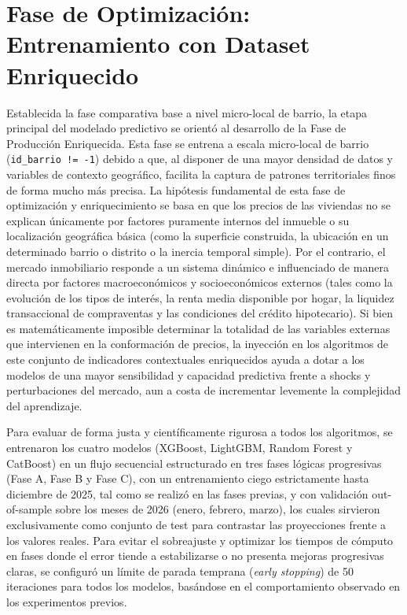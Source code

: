 \documentclass[a4paper,11pt,openany]{book}
\begin{document}
\section{Fase de Optimización: Entrenamiento con Dataset Enriquecido}
Establecida la fase comparativa base a nivel micro-local de barrio, la etapa principal del modelado predictivo se orientó al desarrollo de la Fase de Producción Enriquecida. Esta fase se entrena a escala micro-local de barrio (\texttt{id\_barrio != -1}) debido a que, al disponer de una mayor densidad de datos y variables de contexto geográfico, facilita la captura de patrones territoriales finos de forma mucho más precisa. La hipótesis fundamental de esta fase de optimización y enriquecimiento se basa en que los precios de las viviendas no se explican únicamente por factores puramente internos del inmueble o su localización geográfica básica (como la superficie construida, la ubicación en un determinado barrio o distrito o la inercia temporal simple). Por el contrario, el mercado inmobiliario responde a un sistema dinámico e influenciado de manera directa por factores macroeconómicos y socioeconómicos externos (tales como la evolución de los tipos de interés, la renta media disponible por hogar, la liquidez transaccional de compraventas y las condiciones del crédito hipotecario). Si bien es matemáticamente imposible determinar la totalidad de las variables externas que intervienen en la conformación de precios, la inyección en los algoritmos de este conjunto de indicadores contextuales enriquecidos ayuda a dotar a los modelos de una mayor sensibilidad y capacidad predictiva frente a shocks y perturbaciones del mercado, aun a costa de incrementar levemente la complejidad del aprendizaje.

Para evaluar de forma justa y científicamente rigurosa a todos los algoritmos, se entrenaron los cuatro modelos (XGBoost, LightGBM, Random Forest y CatBoost) en un flujo secuencial estructurado en tres fases lógicas progresivas (Fase A, Fase B y Fase C), con un entrenamiento ciego estrictamente hasta diciembre de 2025, tal como se realizó en las fases previas, y con validación out-of-sample sobre los meses de 2026 (enero, febrero, marzo), los cuales sirvieron exclusivamente como conjunto de test para contrastar las proyecciones frente a los valores reales. Para evitar el sobreajuste y optimizar los tiempos de cómputo en fases donde el error tiende a estabilizarse o no presenta mejoras progresivas claras, se configuró un límite de parada temprana (\textit{early stopping}) de 50 iteraciones para todos los modelos, basándose en el comportamiento observado en los experimentos previos.
\end{document}
